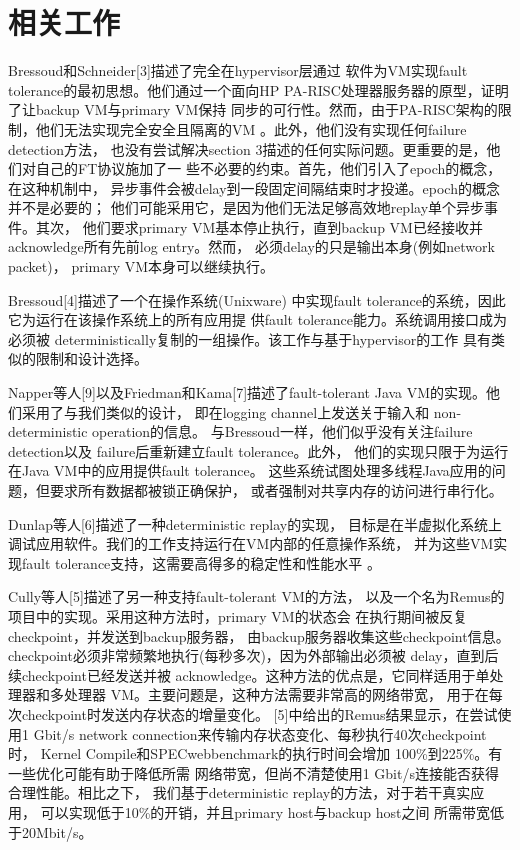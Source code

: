 \section{相关工作}

Bressoud和Schneider[3]描述了完全在hypervisor层通过%
软件为VM实现fault tolerance的最初思想。他们通过一个面向HP %
PA-RISC处理器服务器的原型，证明了让backup VM与primary VM保持%
同步的可行性。然而，由于PA-RISC架构的限制，他们无法实现完全安全且隔离的VM%
。此外，他们没有实现任何failure detection方法，%
也没有尝试解决section 3描述的任何实际问题。更重要的是，他们对自己的FT协议施加了一%
些不必要的约束。首先，他们引入了epoch的概念，在这种机制中，%
异步事件会被delay到一段固定间隔结束时才投递。epoch的概念并不是必要的；%
他们可能采用它，是因为他们无法足够高效地replay单个异步事件。其次，%
他们要求primary VM基本停止执行，直到backup VM已经接收并%
acknowledge所有先前log entry。然而，%
必须delay的只是输出本身(例如network packet)，%
primary VM本身可以继续执行。%

Bressoud[4]描述了一个在操作系统(Unixware)%
中实现fault tolerance的系统，因此它为运行在该操作系统上的所有应用提%
供fault tolerance能力。系统调用接口成为必须被%
deterministically复制的一组操作。该工作与基于hypervisor的工作%
具有类似的限制和设计选择。%

Napper等人[9]以及Friedman和Kama[7]描述了fault-tolerant %
Java VM的实现。他们采用了与我们类似的设计，%
即在logging channel上发送关于输入和%
non-deterministic operation的信息。%
与Bressoud一样，他们似乎没有关注failure detection以及%
failure后重新建立fault tolerance。此外，%
他们的实现只限于为运行在Java VM中的应用提供fault tolerance。%
这些系统试图处理多线程Java应用的问题，但要求所有数据都被锁正确保护，%
或者强制对共享内存的访问进行串行化。%

Dunlap等人[6]描述了一种deterministic replay的实现，%
目标是在半虚拟化系统上调试应用软件。我们的工作支持运行在VM内部的任意操作系统，%
并为这些VM实现fault tolerance支持，这需要高得多的稳定性和性能水平%
。%

Cully等人[5]描述了另一种支持fault-tolerant VM的方法，%
以及一个名为Remus的项目中的实现。采用这种方法时，primary VM的状态会%
在执行期间被反复checkpoint，并发送到backup服务器，%
由backup服务器收集这些checkpoint信息。%
checkpoint必须非常频繁地执行(每秒多次)，因为外部输出必须被%
delay，直到后续checkpoint已经发送并被%
acknowledge。这种方法的优点是，它同样适用于单处理器和多处理器%
VM。主要问题是，这种方法需要非常高的网络带宽，%
用于在每次checkpoint时发送内存状态的增量变化。%
[5]中给出的Remus结果显示，在尝试使用1 Gbit/s %
network connection来传输内存状态变化、每秒执行40次checkpoint时，%
Kernel Compile和\mbox{SPECweb}benchmark的执行时间会增加%
100\%到225\%。有一些优化可能有助于降低所需%
网络带宽，但尚不清楚使用1 Gbit/s连接能否获得合理性能。相比之下，%
我们基于deterministic replay的方法，对于若干真实应用，%
可以实现低于10\%的开销，并且primary host与backup host之间%
所需带宽低于20Mbit/s。
